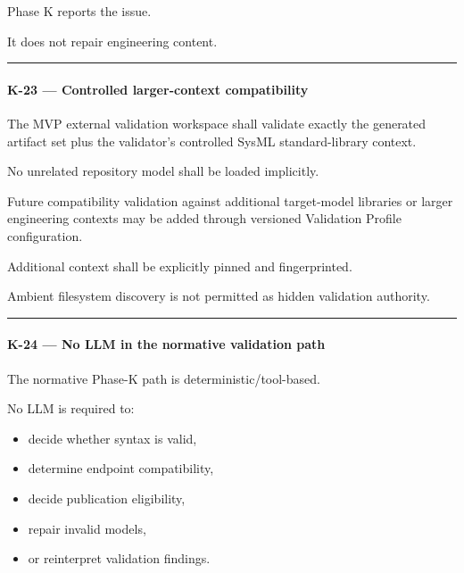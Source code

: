 Phase K reports the issue.

It does not repair engineering content.

\begin{center}\rule{0.5\linewidth}{0.5pt}\end{center}

\hypertarget{k-23--controlled-larger-context-compatibility}{%
\paragraph{K-23 --- Controlled larger-context compatibility}\label{k-23--controlled-larger-context-compatibility}}

The MVP external validation workspace shall validate exactly the generated artifact set plus the validator's controlled SysML standard-library context.

No unrelated repository model shall be loaded implicitly.

Future compatibility validation against additional target-model libraries or larger engineering contexts may be added through versioned Validation Profile configuration.

Additional context shall be explicitly pinned and fingerprinted.

Ambient filesystem discovery is not permitted as hidden validation authority.

\begin{center}\rule{0.5\linewidth}{0.5pt}\end{center}

\hypertarget{k-24--no-llm-in-the-normative-validation-path}{%
\paragraph{K-24 --- No LLM in the normative validation path}\label{k-24--no-llm-in-the-normative-validation-path}}

The normative Phase-K path is deterministic/tool-based.

No LLM is required to:

\begin{itemize}
\tightlist
\item
  decide whether syntax is valid,
\item
  determine endpoint compatibility,
\item
  decide publication eligibility,
\item
  repair invalid models,
\item
  or reinterpret validation findings.
\end{itemize}

